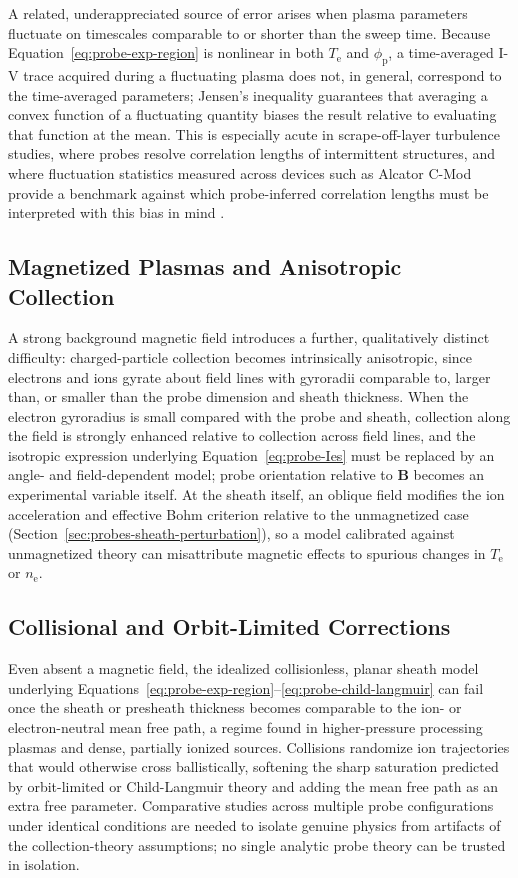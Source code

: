 A related, underappreciated source of error arises when plasma parameters fluctuate on timescales comparable to or shorter than the sweep time. Because Equation~\eqref{eq:probe-exp-region} is nonlinear in both $T_{\mathrm{e}}$ and $\phi_{\mathrm{p}}$, a time-averaged I-V trace acquired during a fluctuating plasma does not, in general, correspond to the time-averaged parameters; Jensen's inequality guarantees that averaging a convex function of a fluctuating quantity biases the result relative to evaluating that function at the mean. This is especially acute in scrape-off-layer turbulence studies, where probes resolve correlation lengths of intermittent structures, and where fluctuation statistics measured across devices such as Alcator C-Mod provide a benchmark against which probe-inferred correlation lengths must be interpreted with this bias in mind \cite{ref0611}.

\subsection{Magnetized Plasmas and Anisotropic Collection}

A strong background magnetic field introduces a further, qualitatively distinct difficulty: charged-particle collection becomes intrinsically anisotropic, since electrons and ions gyrate about field lines with gyroradii comparable to, larger than, or smaller than the probe dimension and sheath thickness. When the electron gyroradius is small compared with the probe and sheath, collection along the field is strongly enhanced relative to collection across field lines, and the isotropic expression underlying Equation~\eqref{eq:probe-Ies} must be replaced by an angle- and field-dependent model; probe orientation relative to $\mathbf{B}$ becomes an experimental variable itself. At the sheath itself, an oblique field modifies the ion acceleration and effective Bohm criterion relative to the unmagnetized case (Section~\ref{sec:probes-sheath-perturbation}), so a model calibrated against unmagnetized theory can misattribute magnetic effects to spurious changes in $T_{\mathrm{e}}$ or $n_{\mathrm{e}}$.

\subsection{Collisional and Orbit-Limited Corrections}

Even absent a magnetic field, the idealized collisionless, planar sheath model underlying Equations~\eqref{eq:probe-exp-region}--\eqref{eq:probe-child-langmuir} can fail once the sheath or presheath thickness becomes comparable to the ion- or electron-neutral mean free path, a regime found in higher-pressure processing plasmas and dense, partially ionized sources. Collisions randomize ion trajectories that would otherwise cross ballistically, softening the sharp saturation predicted by orbit-limited or Child-Langmuir theory and adding the mean free path as an extra free parameter. Comparative studies across multiple probe configurations under identical conditions are needed to isolate genuine physics from artifacts of the collection-theory assumptions; no single analytic probe theory can be trusted in isolation.

